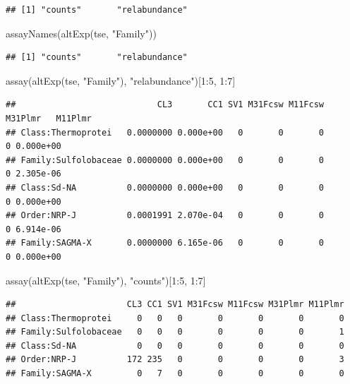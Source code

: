 \documentclass[
]{book}
\newenvironment{Shaded}{\begin{snugshade}}{\end{snugshade}}
\newcommand{\DecValTok}[1]{\textcolor[rgb]{0.00,0.00,0.81}{#1}}
\newcommand{\FunctionTok}[1]{\textcolor[rgb]{0.00,0.00,0.00}{#1}}
\newcommand{\NormalTok}[1]{#1}
\newcommand{\SpecialCharTok}[1]{\textcolor[rgb]{0.00,0.00,0.00}{#1}}
\newcommand{\StringTok}[1]{\textcolor[rgb]{0.31,0.60,0.02}{#1}}
\begin{document}
\begin{verbatim}
## [1] "counts"       "relabundance"
\end{verbatim}

\begin{Shaded}
\begin{Highlighting}[]
\FunctionTok{assayNames}\NormalTok{(}\FunctionTok{altExp}\NormalTok{(tse, }\StringTok{"Family"}\NormalTok{))}
\end{Highlighting}
\end{Shaded}

\begin{verbatim}
## [1] "counts"       "relabundance"
\end{verbatim}

\begin{Shaded}
\begin{Highlighting}[]
\FunctionTok{assay}\NormalTok{(}\FunctionTok{altExp}\NormalTok{(tse, }\StringTok{"Family"}\NormalTok{), }\StringTok{"relabundance"}\NormalTok{)[}\DecValTok{1}\SpecialCharTok{:}\DecValTok{5}\NormalTok{, }\DecValTok{1}\SpecialCharTok{:}\DecValTok{7}\NormalTok{]}
\end{Highlighting}
\end{Shaded}

\begin{verbatim}
##                            CL3       CC1 SV1 M31Fcsw M11Fcsw M31Plmr   M11Plmr
## Class:Thermoprotei   0.0000000 0.000e+00   0       0       0       0 0.000e+00
## Family:Sulfolobaceae 0.0000000 0.000e+00   0       0       0       0 2.305e-06
## Class:Sd-NA          0.0000000 0.000e+00   0       0       0       0 0.000e+00
## Order:NRP-J          0.0001991 2.070e-04   0       0       0       0 6.914e-06
## Family:SAGMA-X       0.0000000 6.165e-06   0       0       0       0 0.000e+00
\end{verbatim}

\begin{Shaded}
\begin{Highlighting}[]
\FunctionTok{assay}\NormalTok{(}\FunctionTok{altExp}\NormalTok{(tse, }\StringTok{"Family"}\NormalTok{), }\StringTok{"counts"}\NormalTok{)[}\DecValTok{1}\SpecialCharTok{:}\DecValTok{5}\NormalTok{, }\DecValTok{1}\SpecialCharTok{:}\DecValTok{7}\NormalTok{]}
\end{Highlighting}
\end{Shaded}

\begin{verbatim}
##                      CL3 CC1 SV1 M31Fcsw M11Fcsw M31Plmr M11Plmr
## Class:Thermoprotei     0   0   0       0       0       0       0
## Family:Sulfolobaceae   0   0   0       0       0       0       1
## Class:Sd-NA            0   0   0       0       0       0       0
## Order:NRP-J          172 235   0       0       0       0       3
## Family:SAGMA-X         0   7   0       0       0       0       0
\end{verbatim}
\end{document}
